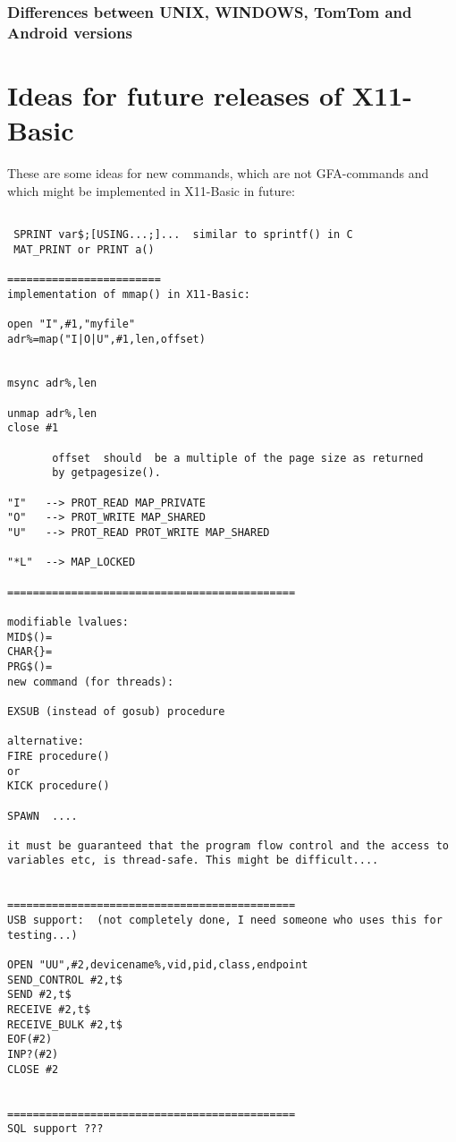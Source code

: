 \subsubsection*{Differences between UNIX, WINDOWS, TomTom and Android versions}

\section{Ideas for future releases of X11-Basic}

These are some ideas for new commands, which are not GFA-commands and 
which might be implemented in X11-Basic in future:

\begin{verbatim}

 SPRINT var$;[USING...;]...  similar to sprintf() in C 
 MAT_PRINT or PRINT a()

========================
implementation of mmap() in X11-Basic:

open "I",#1,"myfile"
adr%=map("I|O|U",#1,len,offset)


msync adr%,len

unmap adr%,len
close #1

       offset  should  be a multiple of the page size as returned
       by getpagesize().

"I"   --> PROT_READ MAP_PRIVATE
"O"   --> PROT_WRITE MAP_SHARED
"U"   --> PROT_READ PROT_WRITE MAP_SHARED

"*L"  --> MAP_LOCKED

=============================================

modifiable lvalues:
MID$()=
CHAR{}=
PRG$()=
new command (for threads):

EXSUB (instead of gosub) procedure

alternative:
FIRE procedure()
or
KICK procedure()

SPAWN  ....

it must be guaranteed that the program flow control and the access to 
variables etc, is thread-safe. This might be difficult....


=============================================
USB support:  (not completely done, I need someone who uses this for testing...)

OPEN "UU",#2,devicename%,vid,pid,class,endpoint
SEND_CONTROL #2,t$
SEND #2,t$
RECEIVE #2,t$
RECEIVE_BULK #2,t$
EOF(#2)
INP?(#2)
CLOSE #2


=============================================
SQL support ???


\end{verbatim}

